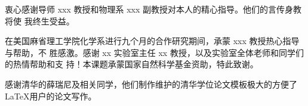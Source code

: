 

\begin{ack}
  衷心感谢导师 xxx 教授和物理系 xxx 副教授对本人的精心指导。他们的言传身教将使
  我终生受益。

  在美国麻省理工学院化学系进行九个月的合作研究期间，承蒙 xxx 教授热心指导与帮助，不
  胜感激。感谢 xx 实验室主任 xx 教授，以及实验室全体老师和同学们的热情帮助和支
  持！本课题承蒙国家自然科学基金资助，特此致谢。

  感谢清华的薛瑞尼及相关同学，他们制作维护的清华学位论文模板极大的方便了\LaTeX{}用户的论文写作。

\end{ack}
